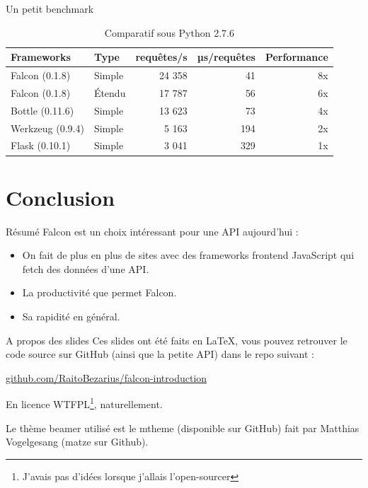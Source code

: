 \documentclass[10pt, compress]{beamer}
\begin{document}
\begin{frame}{Un petit benchmark}
	\begin{table}
        \caption{Comparatif sous Python 2.7.6}
        \pause
    	\begin{tabular}{llrrr}
          \toprule
          Frameworks & Type & requêtes/s & µs/requêtes & Performance \\
          \midrule
          Falcon (0.1.8) & Simple & 24 358 & 41 & 8x \\
          Falcon (0.1.8) & Étendu & 17 787 & 56 & 6x \\
          Bottle (0.11.6) & Simple & 13 623 & 73 & 4x \\
          Werkzeug (0.9.4) & Simple & 5 163 & 194 & 2x \\
          Flask (0.10.1) & Simple & 3 041 & 329 & 1x \\
          \bottomrule
        \end{tabular}
    \end{table}
\end{frame}

\section{Conclusion}
\begin{frame}{Résumé}
	Falcon est un choix intéressant pour une API aujourd'hui :
    \pause
    \begin{itemize}[<+->]
    	\item On fait de plus en plus de sites avec des frameworks frontend JavaScript qui fetch des données \alert{d'une API}.
        \item La \alert{productivité} que permet Falcon.
        \item Sa \alert{rapidité} en général.
    \end{itemize}
\end{frame}

\begin{frame}{A propos des slides}
	Ces slides ont été faits en \LaTeX{}, vous pouvez retrouver le code source sur GitHub (ainsi que la petite API) dans le repo suivant :
	
    \begin{center}\url{github.com/RaitoBezarius/falcon-introduction}\end{center}
    
    En licence WTFPL\footnote{J'avais pas d'idées lorsque j'allais l'open-sourcer}, naturellement.
    
    Le thème beamer utilisé est le mtheme (disponible sur GitHub) fait par Matthias Vogelgesang (matze sur Github).

\end{frame}

\end{document}
